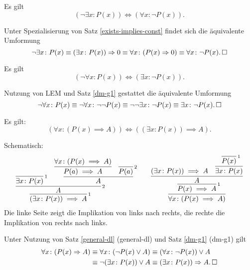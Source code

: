 \begin{Satz}%
\label{dm-g1} Es gilt
\[(\neg\exists x\colon P(x))\iff (\forall x\colon \neg P(x)).\]
\end{Satz}
\begin{Beweis} Unter Spezialisierung von Satz \ref{exists-implies-const}
findet sich die äquivalente Umformung%
\[\neg\exists x\colon P(x)\equiv (\exists x\colon P(x))\Rightarrow 0
\equiv \forall x\colon (P(x)\Rightarrow 0)
\equiv \forall x\colon \neg P(x).\,\square\]
\end{Beweis}
\begin{Satz}%
\label{dm-g2} Es gilt
\[(\neg\forall x\colon P(x))\iff (\exists x\colon \neg P(x)).\]
\end{Satz}
\begin{Beweis}
Nutzung von LEM und Satz \ref{dm-g1} gestattet die äquivalente
Umformung%
\[\neg\forall x\colon P(x)
\equiv\neg\forall x\colon \neg\neg P(x)
\equiv\neg\neg\exists x\colon \neg P(x)
\equiv\exists x\colon \neg P(x).\,\square\]
\end{Beweis}

\begin{Satz}\label{exists-implies-const}
Es gilt:
\[(\forall x\colon (P(x)\implies A)) \iff ((\exists x\colon P(x))\implies A).\]
\end{Satz}
\begin{Beweis} Schematisch:
\[\begin{array}{c@{\qquad}c}
\infer[\infernote{1}]{(\exists x\colon P(x))\implies A}{
  \infer[\infernote{2}]{A}{
    \infer[\infernote{1}]{\exists x\colon P(x)}{}
  & \infer{A}{
      \infer{P(a)\implies A}{\forall x\colon (P(x)\implies A)}
    & \infer[\infernote{2}]{P(a)}{}}}}
&
\infer{\forall x\colon (P(x)\implies A)}{
  \infer[\infernote{1}]{P(x)\implies A}{
    \infer{A}{
      (\exists x\colon P(x))\implies A
    & \infer{\exists x\colon P(x)}{
        \infer[\infernote{1}]{P(x)}{}}}}}
\end{array}
\]
Die linke Seite zeigt die Implikation von links nach rechts,
die rechte die Implikation von rechts nach links.\,\qedsymbol
\end{Beweis}
\begin{Beweis}
Unter Nutzung von Satz \ref{general-dl} (general-dl)
und Satz \ref{dm-g1} (dm-g1) gilt
\begin{align*}
\forall x\colon (P(x)\Rightarrow A)
&\equiv \forall x\colon (\neg P(x)\lor A)
\equiv (\forall x\colon \neg P(x))\lor A\\
&\equiv \neg (\exists x\colon P(x))\lor A
\equiv (\exists x\colon P(x))\Rightarrow A.\,\square
\end{align*}
\end{Beweis}

